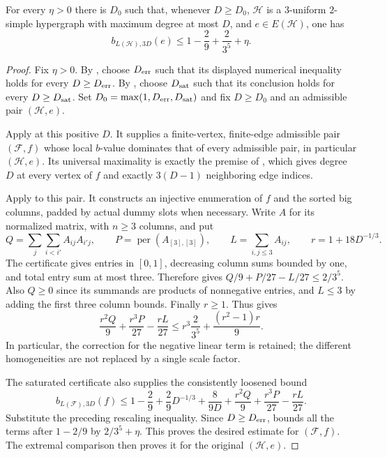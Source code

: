 \begin{lemma}
For every $\eta>0$ there is $D_0$ such that, whenever $D\ge D_0$,
$\mathcal H$ is a $3$-uniform $2$-simple hypergraph with maximum degree at
most $D$, and $e\in E(\mathcal H)$, one has
\[
b_{L(\mathcal H),3D}(e)\le 1-\frac29+\frac{2}{3^5}+\eta .
\]
\end{lemma}
\begin{proof}
Fix $\eta>0$. By ,
choose $D_{\rm err}$ such that its displayed numerical inequality holds
for every $D\ge D_{\rm err}$. By ,
choose $D_{\rm sat}$ such that its conclusion holds for every
$D\ge D_{\rm sat}$. Set $D_0=\max(1,D_{\rm err},D_{\rm sat})$ and fix
$D\ge D_0$ and an admissible pair $(\mathcal H,e)$.

Apply  at this
positive $D$. It supplies a finite-vertex, finite-edge admissible pair
$(\mathcal F,f)$ whose local $b$-value dominates that of every admissible
pair, in particular $(\mathcal H,e)$. Its universal maximality is exactly
the premise of , which gives degree
$D$ at every vertex of $f$ and exactly $3(D-1)$ neighboring edge indices.

Apply  to this
pair. It constructs an injective enumeration of $f$ and the sorted big
columns, padded by actual dummy slots when necessary. Write $A$ for its
normalized matrix, with $n\ge3$ columns, and put
\[
Q=\sum_j\sum_{i<i'}A_{ij}A_{i'j},\qquad
P=\operatorname{per}(A_{[3],[3]}),\qquad
L=\sum_{i,j\le3}A_{ij},\qquad r=1+18D^{-1/3}.
\]
The certificate gives entries in $[0,1]$, decreasing column sums bounded
by one, and total entry sum at most three. Therefore
 gives $Q/9+P/27-L/27\le2/3^5$.
Also $Q\ge0$ since its summands are products of nonnegative entries,
and $L\le3$ by adding the first three column bounds. Finally $r\ge1$.
Thus  gives
\[
\frac{r^2Q}{9}+\frac{r^3P}{27}-\frac{rL}{27}
\le r^3\frac2{3^5}+\frac{(r^2-1)r}{9}.
\]
In particular, the correction for the negative linear term is retained;
the different homogeneities are not replaced by a single scale factor.

The saturated certificate also supplies the consistently loosened bound
\[
b_{L(\mathcal F),3D}(f)\le
1-\frac29+\frac29D^{-1/3}+\frac8{9D}
+\frac{r^2Q}{9}+\frac{r^3P}{27}-\frac{rL}{27}.
\]
Substitute the preceding rescaling inequality. Since $D\ge D_{\rm err}$,
 bounds all the
terms after $1-2/9$ by $2/3^5+\eta$. This proves the desired estimate
for $(\mathcal F,f)$. The extremal comparison then proves it for the
original $(\mathcal H,e)$.
\end{proof}
